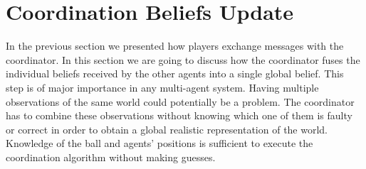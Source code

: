 \section{Coordination Beliefs Update}
\label{sec:UpdateBeliefs}

In the previous section we presented how players exchange messages with the coordinator. In this section we are going to discuss how the coordinator fuses the individual beliefs received by the other agents into a single global belief. This step is of major importance in any multi-agent system. Having multiple observations of the same world could potentially be a problem. The coordinator has to combine these observations without knowing which one of them is faulty or correct in order to obtain a global realistic representation of the world. Knowledge of the ball and agents' positions is sufficient to execute the coordination algorithm without making guesses.

